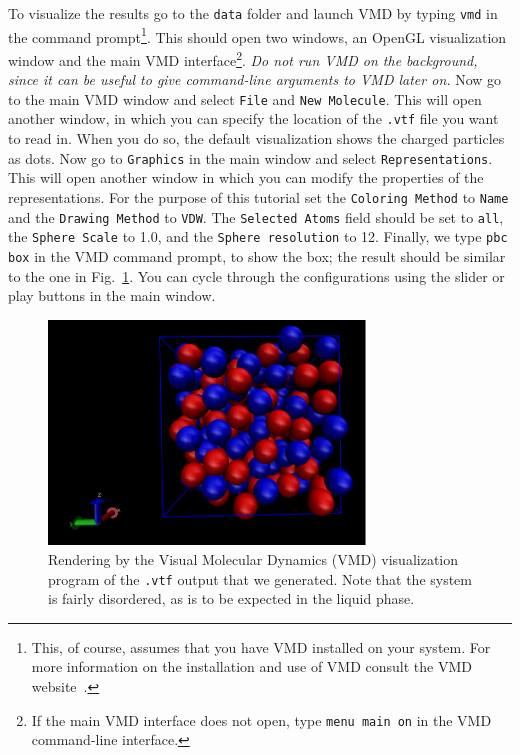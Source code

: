 \documentclass[
a4paper,                        %
11pt,                           %
twoside,                        %
footsepline,                    %
headsepline,                    %
headexclude,                    %
footexclude,                    %
pagesize,                       %
]{scrartcl}
\begin{document}
To visualize the results go to the \texttt{data} folder and launch VMD by typing \texttt{vmd} in the command prompt\footnote{This, of course, assumes that you have VMD installed on your system. For more information on the installation and use of VMD consult the VMD website~\cite{VMD_url}.}. This should open two windows, an OpenGL visualization window and the main VMD interface\footnote{If the main VMD interface does not open, type \texttt{menu main on} in the VMD command-line interface.}. \emph{Do not run VMD on the background, since it can be useful to give command-line arguments to VMD later on.} Now go to the main VMD window and select \texttt{File} and \texttt{New Molecule}. This will open another window, in which you can specify the location of the \texttt{.vtf} file you want to read in. When you do so, the default visualization shows the charged particles as dots. Now go to \texttt{Graphics} in the main window and select \texttt{Representations}. This will open another window in which you can modify the properties of the representations. For the purpose of this tutorial set the \texttt{Coloring Method} to \texttt{Name} and the \texttt{Drawing Method} to \texttt{VDW}. The \texttt{Selected Atoms} field should be set to \texttt{all}, the \texttt{Sphere Scale} to 1.0, and the \texttt{Sphere resolution} to 12. Finally, we type \texttt{pbc box} in the VMD command prompt, to show the box; the result should be similar to the one in Fig.~\ref{fig:vmd}. You can cycle through the configurations using the slider or play buttons in the main window. 

\begin{figure}[!ht]
\begin{center}
\includegraphics[width=0.75\textwidth]{figures/vmd}
\caption{\label{fig:vmd} Rendering by the Visual Molecular Dynamics (VMD) visualization program of the \texttt{.vtf} output that we generated. Note that the system is fairly disordered, as is to be expected in the liquid phase.}
\end{center}
\end{figure}
\end{document}
